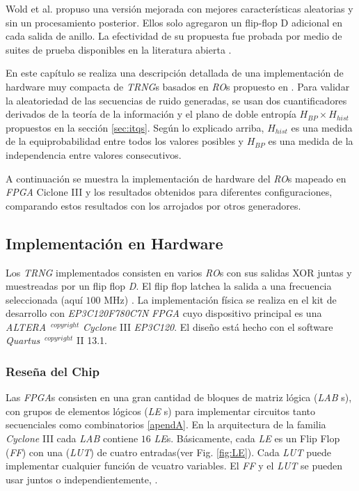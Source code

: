 Wold et al. \cite{Wold2009} propuso una versión mejorada con mejores características aleatorias y sin un procesamiento posterior.
Ellos solo agregaron un flip-flop D adicional en cada salida de anillo.
La efectividad de su propuesta fue probada por medio de suites de prueba disponibles en la literatura abierta \cite{NIST2000, marsaglia1995, NIST2000a}.

En este capítulo se realiza una descripción detallada de una implementación de hardware muy compacta de \emph{TRNG}s basados en \emph{RO}s propuesto en \cite{Wold2009}.
Para validar la aleatoriedad de las secuencias de ruido generadas, se usan dos cuantificadores derivados de la teoría de la información y el plano de doble entropía $H_{BP} \times H_{hist}$ propuestos en la sección \ref{sec:itqs}.
Según lo explicado arriba, $H_{hist}$ es una medida de la equiprobabilidad entre todos los valores posibles y $H_{BP}$ es una medida de la independencia entre valores consecutivos.

A continuación se muestra la implementación de hardware del \emph{RO}s mapeado en \emph{FPGA} Ciclone III y los resultados obtenidos para diferentes configuraciones, comparando estos resultados con los arrojados por otros generadores.

\subsection{Implementación en Hardware}

Los \emph{TRNG} implementados consisten en varios \emph{RO}s con sus salidas XOR juntas y muestreadas por un flip flop \emph{D}.
El flip flop latchea la salida a una frecuencia seleccionada (aquí $ 100 $ MHz) \cite{Wold2009}.
La implementación física se realiza en el kit de desarrollo con \emph{EP3C120F780C7N} \emph{FPGA} cuyo dispositivo principal es una  \emph{ALTERA} $^{\ copyright}$ \emph{Cyclone} III \emph{EP3C120}.
El diseño está hecho con el software \emph{Quartus} $^{\ copyright}$ II 13.1.

\subsubsection{Reseña del Chip}

Las \emph{FPGA}s consisten en una gran cantidad de bloques de matriz lógica (\emph{LAB} s), con grupos de elementos lógicos (\emph{LE} s) para implementar circuitos tanto secuenciales como combinatorios \ref{apendA}.
En la arquitectura de la familia \emph{Cyclone} III cada \emph{LAB} contiene $16$ \emph{LE}s.
Básicamente, cada \emph{LE} es un Flip Flop (\emph{FF}) con una (\emph{LUT}) de cuatro entradas(ver Fig. \ref{fig:LE}).
Cada \emph{LUT} puede implementar cualquier función de vcuatro variables.
El \emph{FF} y el \emph{LUT} se pueden usar juntos o independientemente, \cite{Altera}.

